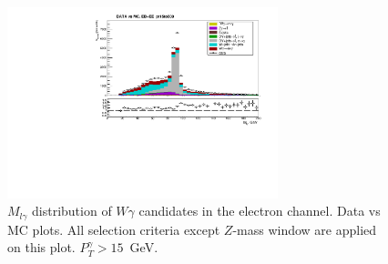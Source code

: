 \begin{figure}[htb]
  \begin{center}
   \includegraphics[width=0.7\textwidth]{../figs/figs_v11/ELECTRON_WGamma/PrepareYields/c_TotalDATAvsMC_EtaCommon__Mpholep1PRELIMINARY_FOR_E_TO_GAMMA_WITH_PSV_CUT_pt15to500_.pdf}
  \caption{$M_{l\gamma}$ distribution of $W\gamma$ candidates in the electron channel. Data vs MC plots. All selection criteria except $Z$-mass window are applied on this plot. $P_T^{\gamma}>15$~GeV. }
  \label{fig:DATAvsMC_Mpholep1}
  \end{center}
\end{figure}

